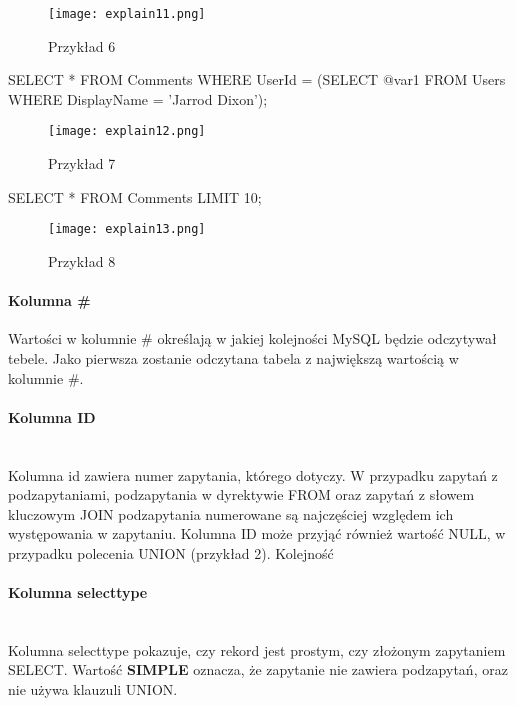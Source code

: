 \begin{figure}[H]
	\texttt{[image: explain11.png]} 
	\caption{Przykład 6}
\end{figure}
\begin{spverbatim}
	SELECT * FROM Comments WHERE UserId = (SELECT @var1 FROM Users WHERE DisplayName = 'Jarrod Dixon');
\end{spverbatim}
\begin{figure}[H]
	\texttt{[image: explain12.png]} 
	\caption{Przykład 7}
\end{figure}
\begin{spverbatim}
SELECT * FROM Comments LIMIT 10;
\end{spverbatim}
\begin{figure}[H]
	\texttt{[image: explain13.png]} 
	\caption{Przykład 8}
\end{figure}

\paragraph{Kolumna \#}
Wartości w kolumnie \# określają w jakiej kolejności MySQL będzie odczytywał tebele. Jako pierwsza zostanie odczytana tabela z największą wartością w kolumnie \#.

\paragraph{Kolumna ID}\leavevmode\\
Kolumna id zawiera numer zapytania, którego dotyczy. W przypadku zapytań z podzapytaniami, podzapytania w dyrektywie FROM oraz zapytań z słowem kluczowym JOIN podzapytania numerowane są najczęściej względem ich występowania w zapytaniu. Kolumna ID może przyjąć również wartość NULL, w przypadku polecenia UNION (przykład 2). Kolejność

\paragraph{Kolumna select\textunderscore type}\leavevmode\\
Kolumna select\textunderscore type pokazuje, czy rekord jest prostym, czy złożonym zapytaniem SELECT. 
Wartość \textbf{SIMPLE} oznacza, że zapytanie nie zawiera podzapytań, oraz nie używa klauzuli UNION.

